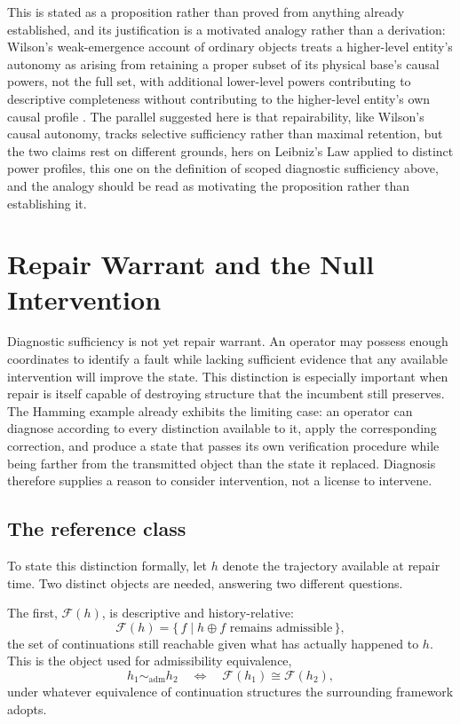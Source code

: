 \documentclass[11pt]{article}
\begin{document}
This is stated as a proposition rather than proved from anything already established, and its justification is a motivated analogy rather than a derivation: Wilson's weak-emergence account of ordinary objects treats a higher-level entity's autonomy as arising from retaining a proper subset of its physical base's causal powers, not the full set, with additional lower-level powers contributing to descriptive completeness without contributing to the higher-level entity's own causal profile \cite{wilson2014}. The parallel suggested here is that repairability, like Wilson's causal autonomy, tracks selective sufficiency rather than maximal retention, but the two claims rest on different grounds, hers on Leibniz's Law applied to distinct power profiles, this one on the definition of scoped diagnostic sufficiency above, and the analogy should be read as motivating the proposition rather than establishing it.

\section{Repair Warrant and the Null Intervention}

Diagnostic sufficiency is not yet repair warrant. An operator may possess
enough coordinates to identify a fault while lacking sufficient evidence
that any available intervention will improve the state. This distinction
is especially important when repair is itself capable of destroying
structure that the incumbent still preserves. The Hamming example already
exhibits the limiting case: an operator can diagnose according to every
distinction available to it, apply the corresponding correction, and
produce a state that passes its own verification procedure while being
farther from the transmitted object than the state it replaced. Diagnosis
therefore supplies a reason to consider intervention, not a license to
intervene.

\subsection{The reference class}

To state this distinction formally, let $h$ denote the trajectory
available at repair time. Two distinct objects are needed, answering two
different questions.

The first, $\mathcal{F}(h)$, is descriptive and history-relative:
\[
	\mathcal{F}(h) = \{\, f \mid h \oplus f \text{ remains admissible} \,\},
\]
the set of continuations still reachable given what has actually
happened to $h$. This is the object used for admissibility equivalence,
\[
	h_1 \sim_{\mathrm{adm}} h_2
	\quad\Longleftrightarrow\quad
	\mathcal{F}(h_1) \cong \mathcal{F}(h_2),
\]
under whatever equivalence of continuation structures the surrounding
framework adopts.
\end{document}
